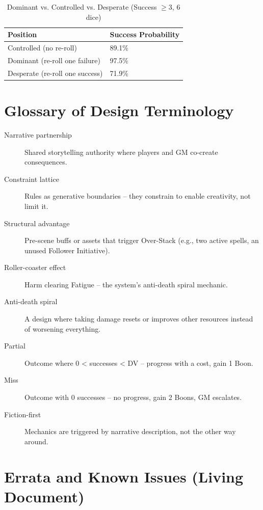 \documentclass[11pt]{article}
\begin{document}
\begin{table}[h]
\centering
\caption{Dominant vs. Controlled vs. Desperate (Success $\geq$3, 6 dice)}
\begin{tabular}{ll}
\toprule
\textbf{Position} & \textbf{Success Probability} \\
\midrule
Controlled (no re-roll) & 89.1\% \\
Dominant (re-roll one failure) & 97.5\% \\
Desperate (re-roll one success) & 71.9\% \\
\bottomrule
\end{tabular}
\end{table}

\section{Glossary of Design Terminology}
\label{sec:glossary}

\begin{description}
    \item[Narrative partnership] Shared storytelling authority where players and GM co-create consequences.
    \item[Constraint lattice] Rules as generative boundaries -- they constrain to enable creativity, not limit it.
    \item[Structural advantage] Pre-scene buffs or assets that trigger Over-Stack (e.g., two active spells, an unused Follower Initiative).
    \item[Roller-coaster effect] Harm clearing Fatigue -- the system's anti-death spiral mechanic.
    \item[Anti-death spiral] A design where taking damage resets or improves other resources instead of worsening everything.
    \item[Partial] Outcome where 0 < successes < DV -- progress with a cost, gain 1 Boon.
    \item[Miss] Outcome with 0 successes -- no progress, gain 2 Boons, GM escalates.
    \item[Fiction-first] Mechanics are triggered by narrative description, not the other way around.
\end{description}

\section{Errata and Known Issues (Living Document)}
\label{sec:errata}
\end{document}
